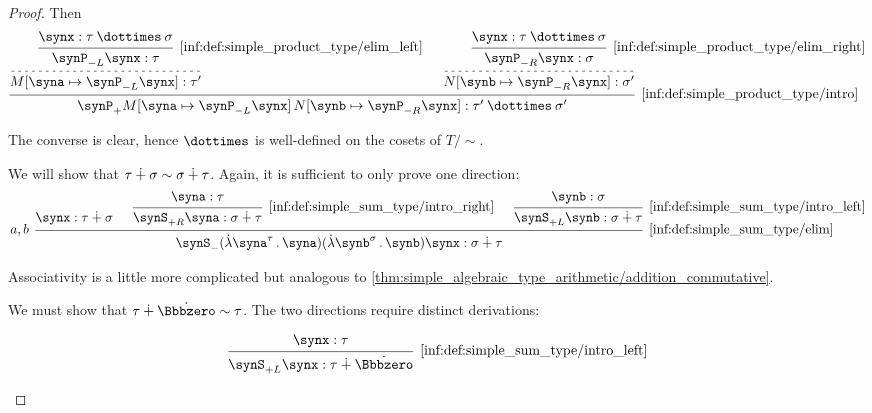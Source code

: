 \begin{proof}
  Then
  \begin{equation*}
    \begin{prooftree}
      \hypo{ \synx: \tau \syntimes \sigma }
      \infer1[\ref{inf:def:simple_product_type/elim_left}]{ \synP_{-L} \synx: \tau }

      \infer[dashed]1{ M[\syna \mapsto \synP_{-L} \synx]: \tau' }

      \hypo{ \synx: \tau \syntimes \sigma }
      \infer1[\ref{inf:def:simple_product_type/elim_right}]{ \synP_{-R} \synx: \sigma }

      \infer[dashed]1{ N[\synb \mapsto \synP_{-R} \synx]: \sigma' }

      \infer2[\ref{inf:def:simple_product_type/intro}]{ \synP_+ M[\syna \mapsto \synP_{-L} \synx] \thinspace N[\synb \mapsto \synP_{-R} \synx]: \tau' \syntimes \sigma' }
    \end{prooftree}
  \end{equation*}

  The converse is clear, hence \( {\syntimes} \) is well-defined on the cosets of \( T / {\sim} \).

   We will show that \( \tau \mathbin{\dotplus} \sigma \sim \sigma \mathbin{\dotplus} \tau \). Again, it is sufficient to only prove one direction:
  \begin{equation*}
    \begin{prooftree}
      \hypo{ \synx: \tau \synplus \sigma }

      \hypo{ \syna: \tau }
      \infer1[\ref{inf:def:simple_sum_type/intro_right}]{ \synS_{+R} \syna: \sigma \synplus \tau }

      \hypo{ \synb: \sigma }
      \infer1[\ref{inf:def:simple_sum_type/intro_left}]{ \synS_{+L} \synb: \sigma \synplus \tau }

      \infer[left label={\( a, b \)}]3[\ref{inf:def:simple_sum_type/elim}]{ \synS_- (\qabs {\syna^\tau} \syna) (\qabs {\synb^{\sigma}} \synb) \synx: \sigma \synplus \tau }
    \end{prooftree}
  \end{equation*}

   Associativity is a little more complicated but analogous to \cref{thm:simple_algebraic_type_arithmetic/addition_commutative}.

   We must show that \( \tau \synplus \syn\Bbbzero \sim \tau \). The two directions require distinct derivations:
  \begin{paracol}{2}
    \begin{leftcolumn}
      \ParacolAlignmentHack
      \begin{equation*}
        \begin{prooftree}
          \hypo{ \synx: \tau }
          \infer1[\ref{inf:def:simple_sum_type/intro_left}]{ \synS_{+L} \synx: \tau \synplus \syn\Bbbzero }
        \end{prooftree}
      \end{equation*}
    \end{leftcolumn}


\end{paracol}
\end{proof}
